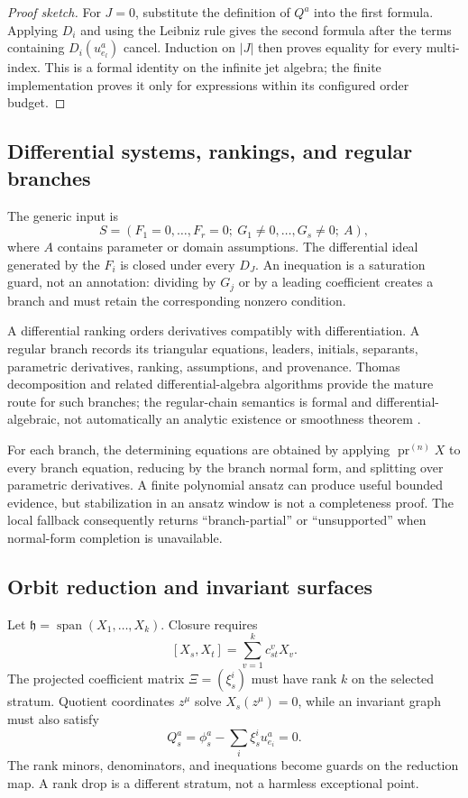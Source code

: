 \documentclass[11pt]{article}
\theoremstyle{definition}
\theoremstyle{remark}
\begin{document}
\begin{proof}[Proof sketch]
For $J=0$, substitute the definition of $Q^a$ into the first formula. Applying $D_i$ and using the
Leibniz rule gives the second formula after the terms containing $D_i(u^a_{e_l})$ cancel. Induction on
$|J|$ then proves equality for every multi-index. This is a formal identity on the infinite jet algebra;
the finite implementation proves it only for expressions within its configured order budget.
\end{proof}

\subsection{Differential systems, rankings, and regular branches}

The generic input is
\[
 S=(F_1=0,\ldots,F_r=0;\ G_1\ne0,\ldots,G_s\ne0;\ A),
\]
where $A$ contains parameter or domain assumptions. The differential ideal generated by the $F_i$ is
closed under every $D_J$. An inequation is a saturation guard, not an annotation: dividing by $G_j$ or by
a leading coefficient creates a branch and must retain the corresponding nonzero condition.

A differential ranking orders derivatives compatibly with differentiation. A regular branch records its
triangular equations, leaders, initials, separants, parametric derivatives, ranking, assumptions, and
provenance. Thomas decomposition and related differential-algebra algorithms provide the mature route for
such branches; the regular-chain semantics is formal and differential-algebraic, not automatically an
analytic existence or smoothness theorem \cite{baechler2012}.

For each branch, the determining equations are obtained by applying $\operatorname{pr}^{(n)}X$ to every
branch equation, reducing by the branch normal form, and splitting over parametric derivatives. A finite
polynomial ansatz can produce useful bounded evidence, but stabilization in an ansatz window is not a
completeness proof. The local fallback consequently returns ``branch-partial'' or ``unsupported'' when
normal-form completion is unavailable.

\subsection{Orbit reduction and invariant surfaces}

Let $\mathfrak h=\operatorname{span}(X_1,\ldots,X_k)$. Closure requires
\[
 [X_s,X_t]=\sum_{v=1}^k c_{st}^{v}X_v.
\]
The projected coefficient matrix $\Xi=(\xi_s^i)$ must have rank $k$ on the selected stratum. Quotient
coordinates $z^\mu$ solve $X_s(z^\mu)=0$, while an invariant graph must also satisfy
\[
 Q_s^a=\phi_s^a-\sum_i\xi_s^i u^a_{e_i}=0.
\]
The rank minors, denominators, and inequations become guards on the reduction map. A rank drop is a
different stratum, not a harmless exceptional point.
\end{document}
